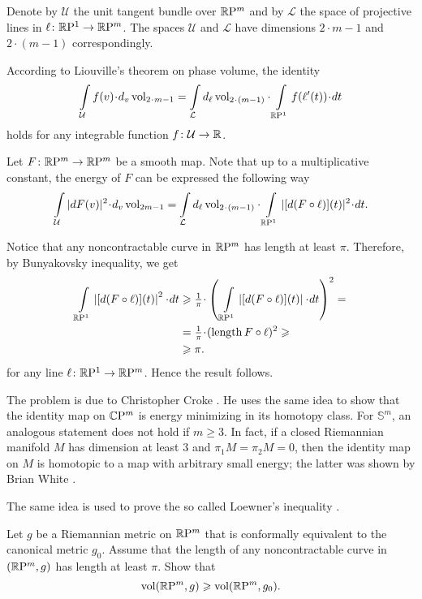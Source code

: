 Denote by $\mathcal{U}$ the unit tangent bundle over $\mathbb{R}\mathrm{P}^m$
and by $\mathcal{L}$ the space of projective lines in $\ell\colon\mathbb{R}\mathrm{P}^1\to \mathbb{R}\mathrm{P}^m$.
The spaces $\mathcal{U}$ and $\mathcal{L}$ 
have dimensions $2\cdot m-1$ 
and $2\cdot(m-1)$
correspondingly.


According to Liouville's theorem on phase volume, the identity
\[\int\limits_{\mathcal{U}}f(v)\cdot d_v\vol_{2\cdot m-1}
=
\int\limits_{\mathcal{L}}d_\ell\vol_{2\cdot(m-1)}\cdot\int\limits_{\RP^1} f(\ell'(t))\cdot dt\]
holds for any integrable function $f\colon\mathcal{U}\to\mathbb{R}$.

Let $F\colon\mathbb{R}\mathrm{P}^m\to\mathbb{R}\mathrm{P}^m$ be a smooth map.
Note that up to a multiplicative constant,
the energy of $F$ can be expressed the following way
\[\int\limits_{\mathcal{U}} |dF(v)|^2\cdot d_v\vol_{2m-1}
=
\int\limits_{\mathcal{L}}d_\ell\vol_{2\cdot(m-1)}\cdot\int\limits_{\RP^1} |[d(F\circ \ell)](t)|^2\cdot dt.\]

Notice that any noncontractable curve in $\mathbb{R}\mathrm{P}^m$ has length at least $\pi$.
Therefore, by Bunyakovsky inequality, we get
\begin{align*}
\int\limits_{\RP^1} \left|[d(F\circ \ell)](t)\right|^2\cdot dt&\ge 
\tfrac1\pi\cdot \left(\,\int\limits_{\RP^1} \left|[d(F\circ \ell)](t)\right|\cdot dt\right)^2=
\\
&=\tfrac1\pi\cdot (\length F\circ\ell)^2\ge
\\
&\ge \pi.
\end{align*}
for any line $\ell\colon\mathbb{R}\mathrm{P}^1\to \mathbb{R}\mathrm{P}^m$.
Hence the result follows.\qeds

\label{page:liouville}
The problem is due to Christopher Croke \cite[see][]{croke-energy}. 
He uses the same idea to show that the identity map on $\mathbb{C}\mathrm{P}^m$ is energy minimizing in its homotopy class.
For $\mathbb S^m$, an analogous statement does not hold if $m\ge 3$.
In fact, 
if a closed Riemannian manifold $M$ 
has dimension at least 3 
and $\pi_1M=\pi_2M=0$,
then the identity map on $M$ is homotopic 
to a map with arbitrary small energy;
the latter was shown by Brian White \cite[see][]{white}.

The same idea is used to prove the so called Loewner's inequality \cite[see][]{gromov-filling}.
\begin{pr}
Let $g$ be a Riemannian metric on $\mathbb{R}\mathrm{P}^m$ that is conformally equivalent to the canonical metric $g_0$.
Assume that the length of any noncontractable curve in $(\mathbb{R}\mathrm{P}^m,g)$ has length at least $\pi$.
Show that 
\[\operatorname{\rm vol}\nolimits(\mathbb{R}\mathrm{P}^m,g)\geqslant\operatorname{\rm vol}\nolimits(\mathbb{R}\mathrm{P}^m,g_0).\]

\end{pr}

